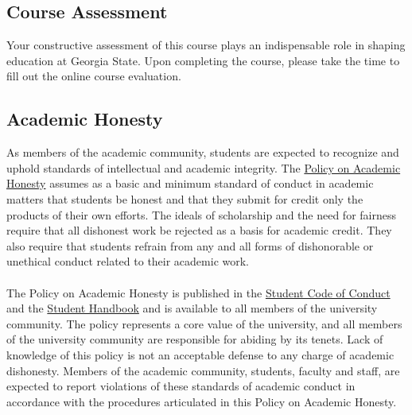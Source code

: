 \documentclass[a4paper, 12pt]{article}
\begin{document}
\subsection{Course Assessment}
Your constructive assessment of this course plays an indispensable role in shaping education at Georgia State. Upon completing the course, please take the time to fill out the online course evaluation.

\subsection{Academic Honesty}
As members of the academic community, students are expected to recognize and uphold standards of intellectual and academic integrity. The \href{https://deanofstudents.gsu.edu/document/policy-on-academic-honesty/?wpdmdl=4950/}{Policy on Academic Honesty} assumes as a basic and minimum standard of conduct in academic matters that students be honest and that they submit for credit only the products of their own efforts. The ideals of scholarship and the need for fairness require that all dishonest work be rejected as a basis for academic credit. They also require that students refrain from any and all forms of dishonorable or unethical conduct related to their academic work.\\
\\
The Policy on Academic Honesty is published in the \href{https://www.dropbox.com/scl/fi/6840vhdcpcssiy9ynbxex/Code-with-Cover-R-09072023.pdf?rlkey=38lfkvrq44wd8mdjj84r2ryac&e=1&dl=0}{Student Code of Conduct} and the \href{https://catalogs.gsu.edu/content.php?catoid=7}{Student Handbook} and is available to all members of the university community. The policy represents a core value of the university, and all members of the university community are responsible for abiding by its tenets. Lack of knowledge of this policy is not an acceptable defense to any charge of academic dishonesty. Members of the academic community, students, faculty and staff, are expected to report violations of these standards of academic conduct in accordance with the procedures articulated in this Policy on Academic Honesty.
\end{document}
